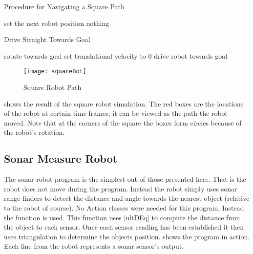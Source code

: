 \documentclass[main.tex]{subfiles}
\begin{document}
\begin{algorithm}
\caption{Procedure for Navigating a Square Path}
\label{al:alg1}
\begin{algorithmic}
		\STATE set the next robot position 
			\STATE nothing
		\ENDWHILE
	\ENDFOR
\end{algorithmic}
\end{algorithm}

\newcommand{\delxi}{\Delta\xi}

\begin{algorithm}
\caption{Drive Straight Towards Goal}
\label{al:driveStraight}
	\begin{algorithmic}
			\STATE rotate towards goal
			\STATE set translational velocity to 0
			\STATE drive robot towards goal
		\ENDIF
	\end{algorithmic}
\end{algorithm}

\begin{figure}[H]
	\begin{center}
	\texttt{[image: squareBot]}
	\end{center}
	\caption{Square Robot Path}
	\label{fig:sqBotPath}
\end{figure}

 shows the result of the square robot simulation. The red
boxes are the locations of the robot at certain time frames; it can be viewed as
the path the robot moved. Note that at the corners of the square the boxes form
circles because of the robot's rotation.

\subsection{Sonar Measure Robot} 

The sonar robot program is the simplest out of
those presented here. That is the robot does not move during the program.
Instead the robot simply uses sonar range finders to detect the distance and
angle towards the nearest object (relative to the robot of course). No Action
classes were needed for this program. Instead the  function
 is used.  This function uses
\eqref{ultDEq} to compute the distance from the object to each sensor. Once each
sensor reading has been established it then uses triangulation to determine the
objects position.  shows the program in action. Each line from
the robot represents a sonar sensor's output.
\end{document}
